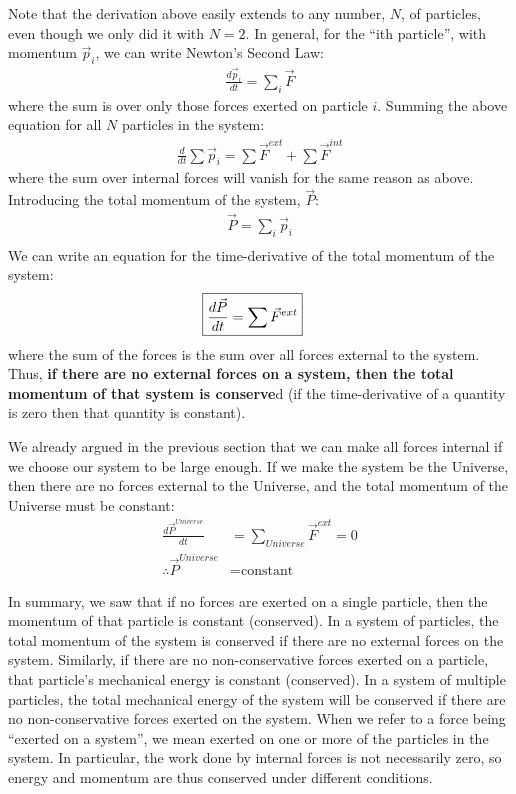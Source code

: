 Note that the derivation above easily extends to any number, $N$, of particles, even though we only did it with $N=2$. In general, for the ``ith particle'', with momentum $\vec p_i$, we can write Newton's Second Law:
\begin{align*}
\frac{d\vec p_i}{dt}=\sum_i \vec F
\end{align*} 
where the sum is over only those forces exerted on particle $i$. Summing the above equation for all $N$ particles in the system:
\begin{align*}
\frac{d}{dt}\sum \vec p_i=\sum \vec F^{ext} + \sum \vec F^{int}
\end{align*}
where the sum over internal forces will vanish for the same reason as above. Introducing the total momentum of the system, $\vec P$:
\begin{align*}
\vec P = \sum_i \vec p_i\\
\end{align*}
We can write an equation for the time-derivative of the total momentum of the system:
\begin{align}
\Aboxed{\frac{d\vec P}{dt} &= \sum \vec F^{ext}}
\end{align}
where the sum of the forces is the sum over all forces external to the system. Thus, \textbf{if there are no external forces on a system, then the total momentum of that system is conserve}d (if the time-derivative of a quantity is zero then that quantity is constant).

We already argued in the previous section that we can make all forces internal if we choose our system to be large enough. If we make the system be the Universe, then there are no forces external to the Universe, and the total momentum of the Universe must be constant:
\begin{align*}
\frac{d\vec P^{Universe}}{dt} &= \sum_{Universe} \vec F^{ext} = 0 \\
\therefore \vec P^{Universe}&=\text{constant}
\end{align*}

In summary, we saw that if no forces are exerted on a single particle, then the momentum of that particle is constant (conserved). In a system of particles, the total momentum of the system is conserved if there are no external forces on the system. Similarly, if there are no non-conservative forces exerted on a particle, that particle's mechanical energy is constant (conserved). In a system of multiple particles, the total mechanical energy of the system will be conserved if there are no non-conservative forces exerted on the system. When we refer to a force being ``exerted on a system'', we mean exerted on one or more of the particles in the system. In particular, the work done by internal forces is not necessarily zero, so energy and momentum are thus conserved under different conditions.

